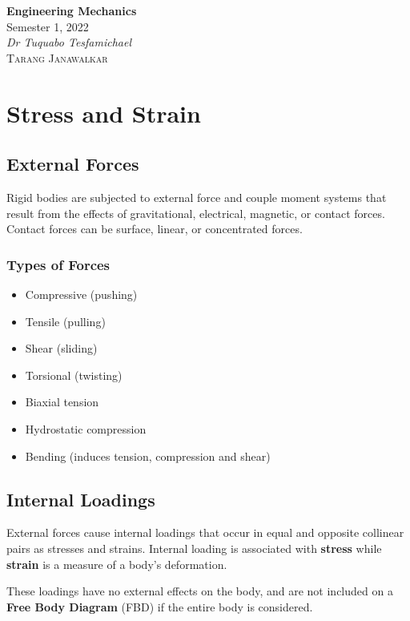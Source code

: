\documentclass{article}
\date{}
\newcommand{\unitName}{Engineering Mechanics}
\newcommand{\unitTime}{Semester 1, 2022}
\newcommand{\unitCoordinator}{Dr Tuquabo Tesfamichael}
\newcommand{\documentAuthors}{\textsc{Tarang Janawalkar}}
\begin{document}
%
\begin{titlepage}
    \vspace*{\fill}
    \begin{center}
        \LARGE{\textbf{\unitName}} \\[0.1in]
        \normalsize{\unitTime} \\[0.2in]
        \normalsize\textit{\unitCoordinator} \\[0.2in]
        \documentAuthors
    \end{center}
    \vspace*{\fill}
    \doclicenseThis
    \thispagestyle{empty}
\end{titlepage}
\newpage
%
\tableofcontents
\newpage
%
\section{Stress and Strain}
\subsection{External Forces}
Rigid bodies are subjected to external force and couple moment systems that result from the effects of gravitational,
electrical, magnetic, or contact forces. Contact forces can be surface, linear, or concentrated forces.
\subsubsection{Types of Forces}
\begin{itemize}
    \item Compressive (pushing)
    \item Tensile (pulling)
    \item Shear (sliding)
    \item Torsional (twisting)
    \item Biaxial tension
    \item Hydrostatic compression
    \item Bending (induces tension, compression and shear)
\end{itemize}
\subsection{Internal Loadings}
External forces cause internal loadings that occur in equal and opposite collinear pairs as stresses and strains.
Internal loading is associated with \textbf{stress} while \textbf{strain} is a measure of a body's deformation.

These loadings have no external effects on the body, and are not included on a \textbf{Free Body Diagram} (FBD) if
the entire body is considered.
\end{document}
